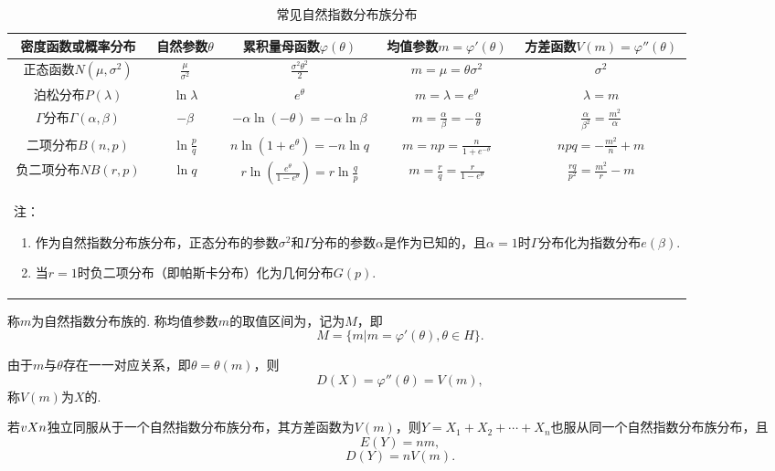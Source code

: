 \begin{landscape}
\begin{table}
\def\arraystretch{2.1}
\centering
\caption{常见自然指数分布族分布}
\begin{tabular}{|*{5}{c|}}
\hline
密度函数或概率分布 & 自然参数\(\theta\) & 累积量母函数\(\varphi(\theta)\) & 均值参数\(m=\varphi'(\theta)\) & 方差函数\(V(m) = \varphi''(\theta)\) \\ \hline
正态函数\(N(\mu,\sigma^2)\) & \(\frac{\mu}{\sigma^2}\) & \(\frac{\sigma^2 \theta^2}{2}\) & \(m=\mu=\theta\sigma^2\) & \(\sigma^2\) \\ \hline
泊松分布\(P(\lambda)\) & \(\ln\lambda\) & \(e^{\theta}\) & \(m=\lambda=e^{\theta}\) & \(\lambda=m\) \\ \hline
\(\Gamma\)分布\(\Gamma(\alpha,\beta)\) & \(-\beta\) & \(-\alpha\ln(-\theta)=-\alpha\ln\beta\) & \(m=\frac{\alpha}{\beta}=-\frac{\alpha}{\theta}\) & \(\frac{\alpha}{\beta^2}=\frac{m^2}{\alpha}\) \\ \hline
二项分布\(B(n,p)\) & \(\ln\frac{p}{q}\) & \(n\ln(1+e^{\theta})=-n\ln{q}\) & \(m=np=\frac{n}{1+e^{-\theta}}\) & \(npq=-\frac{m^2}{n}+m\) \\ \hline
负二项分布\(NB(r,p)\) & \(\ln{q}\) & \(r\ln(\frac{e^{\theta}}{1-e^{\theta}})=r\ln\frac{q}{p}\) & \(m=\frac{r}{q}=\frac{r}{1-e^{\theta}}\) & \(\frac{rq}{p^2}=\frac{m^2}{r}-m\) \\ \hline
\multicolumn{5}{l}{%
\begin{minipage}{.7\paperwidth}
\vspace{1em}
注：\begin{enumerate}
\item 作为自然指数分布族分布，正态分布的参数\(\sigma^2\)和\(\Gamma\)分布的参数\(\alpha\)是作为已知的，且\(\alpha=1\)时\(\Gamma\)分布化为指数分布\(e(\beta)\).
\item 当\(r=1\)时负二项分布（即帕斯卡分布）化为几何分布\(G(p)\).
\end{enumerate}
\end{minipage}
} \\
\end{tabular}
\end{table}
\end{landscape}

\begin{definition}
称\(m\)为自然指数分布族的.
称均值参数\(m\)的取值区间为，记为\(M\)，即\[
M = \{ m \vert m = \varphi'(\theta), \theta \in H \}.
\]

由于\(m\)与\(\theta\)存在一一对应关系，即\(\theta = \theta(m)\)，则\[
D(X) = \varphi''(\theta) = V(m),
\]称\(V(m)\)为\(X\)的.
\end{definition}

\begin{theorem}
若\(v{X}{n}\)独立同服从于一个自然指数分布族分布，其方差函数为\(V(m)\)，则\(Y=X_1+X_2+\dotsb+X_n\)也服从同一个自然指数分布族分布，且\[
E(Y)=n m,
\]\[
D(Y)=n V(m).
\]
\end{theorem}
